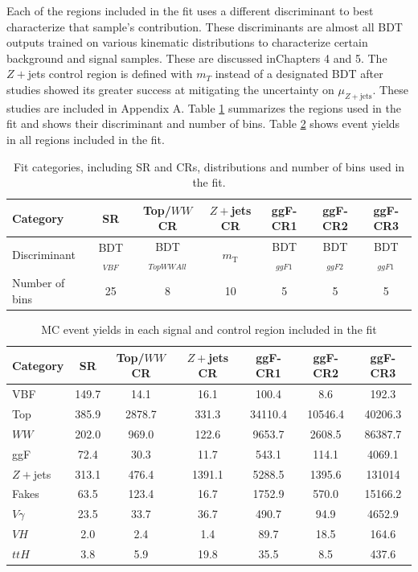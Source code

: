 Each of the regions included in the fit uses a different discriminant to best characterize that sample's contribution. These discriminants are almost all BDT outputs trained on various kinematic distributions to characterize certain background and signal samples. These are discussed inChapters 4 and 5. The $Z+$jets control region is defined with $m_T$ instead of a designated BDT after studies showed its greater success at mitigating the uncertainty on $\mu_{Z+\text{jets}}$. These studies are included in Appendix A. Table \ref{tab:fitinputs} summarizes the regions used in the fit and shows their discriminant and number of bins. Table \ref{tab:cryields} shows event yields in all regions included in the fit. 
\begin{table}[!h]
  \begin{center}
    \begin{tabular}{l|cccccc}
       Category		& SR 	& Top/$WW$ CR 	& $Z+$jets CR 		& ggF-CR1 		& ggF-CR2 	& ggF-CR3 \\
      \hline
      Discriminant	& BDT$_{VBF}$ &  BDT$_{TopWWAll}$	& $m_{\text{T}}$	& BDT$_{ggF1}$	& BDT$_{ggF2}$ & BDT$_{ggF1}$ \\
      Number of bins    &  25 	      & 8 	& 10 			& 5 			& 5 		& 5  \\	
    \end{tabular}
    \caption{Fit categories, including SR and CRs, distributions and number of bins used in the fit.}
    \label{tab:fitinputs}
  \end{center}
\end{table}

\begin{table}[!h]
  \begin{center}
    \begin{tabular}{l|cccccc}
      Category         & SR    & Top/$WW$ CR   & $Z+$jets CR           & ggF-CR1               & ggF-CR2       & ggF-CR3 \\
      \hline
      VBF      & 149.7 & 14.1 & 16.1 & 100.4 & 8.6 & 192.3 \\
      Top    &  385.9 & 2878.7 & 331.3 & 34110.4 & 10546.4 & 40206.3 \\
      $WW$ & 202.0 & 969.0 & 122.6 & 9653.7 & 2608.5 & 86387.7 \\
      ggF & 72.4 & 30.3 & 11.7 & 543.1 & 114.1 & 4069.1 \\
      $Z+$jets & 313.1 & 476.4 & 1391.1 & 5288.5 & 1395.6 & 131014 \\
      Fakes & 63.5 & 123.4 & 16.7 & 1752.9 & 570.0 & 15166.2 \\
      $V\gamma$ & 23.5 & 33.7 & 36.7 & 490.7 & 94.9 & 4652.9 \\
      $VH$ & 2.0 & 2.4 & 1.4 & 89.7 & 18.5 & 164.6 \\
      $ttH$ &  3.8 &  5.9 &  19.8 & 35.5 & 8.5 & 437.6 \\
      \hline
    \end{tabular}
    \caption{MC event yields in each signal and control region included in the fit}
    \label{tab:cryields}
  \end{center}
\end{table}

